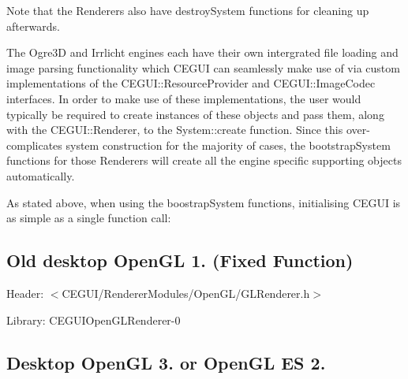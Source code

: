 Note that the Renderers also have destroy\+System functions for cleaning up afterwards.

The Ogre3D and Irrlicht engines each have their own intergrated file loading and image parsing functionality which C\+E\+G\+UI can seamlessly make use of via custom implementations of the C\+E\+G\+U\+I\+::\+Resource\+Provider and C\+E\+G\+U\+I\+::\+Image\+Codec interfaces. In order to make use of these implementations, the user would typically be required to create instances of these objects and pass them, along with the C\+E\+G\+U\+I\+::\+Renderer, to the System\+::create function. Since this over-\/complicates system construction for the majority of cases, the bootstrap\+System functions for those Renderers will create all the engine specific supporting objects automatically.

As stated above, when using the boostrap\+System functions, initialising C\+E\+G\+UI is as simple as a single function call\+:\hypertarget{rendering_tutorial_rendering_tutorial_bootstrap_opengl}{}\subsection{Old desktop Open\+G\+L 1. (\+Fixed Function)}\label{rendering_tutorial_rendering_tutorial_bootstrap_opengl}

\begin{DoxyItemize}
\item Header\+: $<$C\+E\+G\+U\+I/\+Renderer\+Modules/\+Open\+G\+L/\+G\+L\+Renderer.\+h$>$
\item Library\+: C\+E\+G\+U\+I\+Open\+G\+L\+Renderer-\/0 
\begin{DoxyCode}{0}
\DoxyCodeLine{\textcolor{comment}{// Bootstrap CEGUI::System with an OpenGLRenderer object that uses the}}
\DoxyCodeLine{\textcolor{comment}{// current GL viewport, the DefaultResourceProvider, and the default}}
\DoxyCodeLine{\textcolor{comment}{// ImageCodec.}}
\DoxyCodeLine{\textcolor{comment}{//}}
\DoxyCodeLine{\textcolor{comment}{// NB: Your OpenGL context must already be initialised when you call this; CEGUI}}
\DoxyCodeLine{\textcolor{comment}{// will not create the OpenGL context itself.}}
\end{DoxyCode}

\end{DoxyItemize}\hypertarget{rendering_tutorial_rendering_tutorial_bootstrap_opengl3}{}\subsection{Desktop Open\+G\+L 3. or Open\+G\+L E\+S 2.}\label{rendering_tutorial_rendering_tutorial_bootstrap_opengl3}

